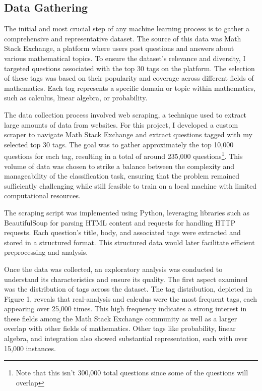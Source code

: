 \documentclass[12pt, letterpaper]{article}
\begin{document}
\subsection{Data Gathering}
The initial and most crucial step of any machine learning process is to gather a comprehensive and representative dataset. The source of this data was Math Stack Exchange, a platform where users post questions and answers about various mathematical topics. To ensure the dataset's relevance and diversity, I targeted questions associated with the top 30 tags on the platform. The selection of these tags was based on their popularity and coverage across different fields of mathematics. Each tag represents a specific domain or topic within mathematics, such as calculus, linear algebra, or probability.
\par The data collection process involved web scraping, a technique used to extract large amounts of data from websites. For this project, I developed a custom scraper to navigate Math Stack Exchange and extract questions tagged with my selected top 30 tags. The goal was to gather approximately the top 10,000 questions for each tag, resulting in a total of around 235,000 questions\footnote{Note that this isn't 300,000 total questions since some of the questions will overlap}. This volume of data was chosen to strike a balance between the complexity and manageability of the classification task, ensuring that the problem remained sufficiently challenging while still feasible to train on a local machine with limited computational resources.
\par The scraping script was implemented using Python, leveraging libraries such as BeautifulSoup for parsing HTML content and requests for handling HTTP requests. Each question's title, body, and associated tags were extracted and stored in a structured format. This structured data would later facilitate efficient preprocessing and analysis.
\par Once the data was collected, an exploratory analysis was conducted to understand its characteristics and ensure its quality. The first aspect examined was the distribution of tags across the dataset. The tag distribution, depicted in Figure 1, reveals that real-analysis and calculus were the most frequent tags, each appearing over 25,000 times. This high frequency indicates a strong interest in these fields among the Math Stack Exchange community as well as a larger overlap with other fields of mathematics. Other tags like probability, linear algebra, and integration also showed substantial representation, each with over 15,000 instances.
\end{document}
